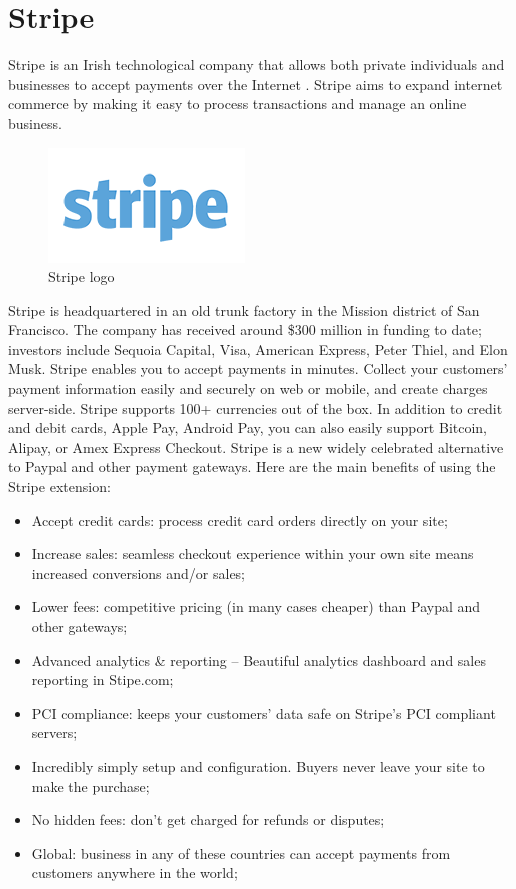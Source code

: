 \section{Stripe}
\label{sec:stripe}
Stripe is an Irish technological company that allows both private individuals and businesses to accept payments over the Internet \cite{stripe_doc_a}.
Stripe aims to expand internet commerce by making it easy to process transactions and manage an online business.
\begin{figure}[htb]
\centering
\includegraphics[width=0.5\linewidth]{images/chapter2/stripe-logo.png}\hfill
\caption[Stripe logo]{Stripe logo}
\label{fig:stripe_logo}
\end{figure}
Stripe is headquartered in an old trunk factory in the Mission district of San Francisco. The company has received around \$300 million in funding to date; investors include Sequoia Capital, Visa, American Express, Peter Thiel, and Elon Musk. Stripe enables you to accept payments in minutes. Collect your customers’ payment information easily and securely on web or mobile, and create charges server-side. Stripe supports 100+ currencies out of the box. In addition to credit and debit cards, Apple Pay, Android Pay, you can also easily support Bitcoin, Alipay, or Amex Express Checkout.
\newline
Stripe is a new widely celebrated alternative to Paypal and other payment gateways. Here are the main benefits of using the Stripe extension:
\begin{itemize}
\item Accept credit cards: process credit card orders directly on your site;
\item Increase sales: seamless checkout experience within your own site means increased conversions and/or sales;
\item Lower fees: competitive pricing (in many cases cheaper) than Paypal and other gateways;
\item Advanced analytics \& reporting – Beautiful analytics dashboard and sales reporting in Stipe.com;
\item PCI compliance: keeps your customers’ data safe on Stripe’s PCI compliant servers;
\item Incredibly simply setup and configuration. Buyers never leave your site to make the purchase;
\item No hidden fees: don’t get charged for refunds or disputes;
\item Global: business in any of these countries can accept payments from customers anywhere in the world;
\end{itemize}
